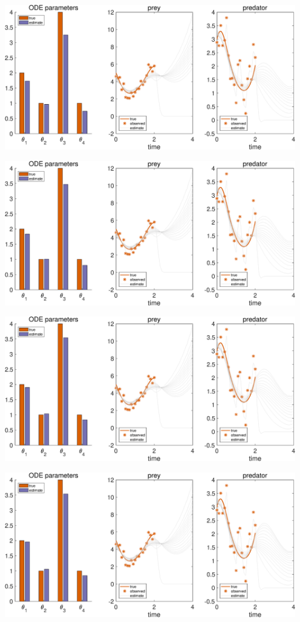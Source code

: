 {\includegraphics [width=5in]{Lotka_Volterra_3_17.eps}

\includegraphics [width=5in]{Lotka_Volterra_3_18.eps}

\includegraphics [width=5in]{Lotka_Volterra_3_19.eps}

\includegraphics [width=5in]{Lotka_Volterra_3_20.eps}

}
